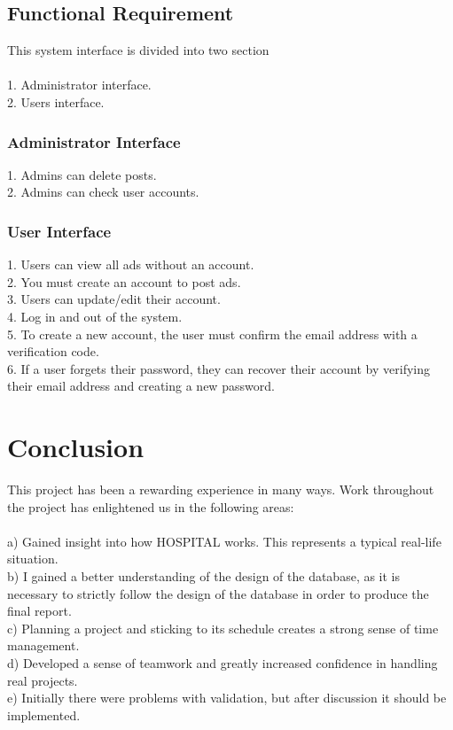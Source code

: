 \documentclass{article}
\begin{document}
\subsection{Functional Requirement}
This system interface is divided into two section\\\\ 
1.	Administrator interface.  \\
2.	Users interface. \\
\subsubsection{Administrator Interface}
1. Admins can delete posts.\\
2. Admins can check user accounts.  
\subsubsection{User Interface}
1. Users can view all ads without an account.\\
2. You must create an account to post ads.\\
3. Users can update/edit their account. \\4. Log in and out of the system.\\
5. To create a new account, the user must confirm the email address with a verification code.\\
6. If a user forgets their password, they can recover their account by verifying their email address and creating a new password.
\newpage
\section{Conclusion}
This project has been a rewarding experience in many ways. Work throughout the project has enlightened us in the following areas:\\\\
a) Gained insight into how HOSPITAL works. This represents a typical real-life situation.\\
b) I gained a better understanding of the design of the database, as it is necessary to strictly follow the design of the database in order to produce the final report.\\ c) Planning a project and sticking to its schedule creates a strong sense of time management.\\
d) Developed a sense of teamwork and greatly increased confidence in handling real projects.\\
e) Initially there were problems with validation, but after discussion it should be implemented.\\
\end{document}
